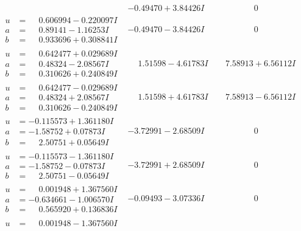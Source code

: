 \documentclass[1p]{elsarticle_modified}
\theoremstyle{definition}
\begin{document}
$$\begin{array}{c|c|c}
 & -0.49470 + 3.84426 I & \phantom{-0.000000 } 0 \\ \hline\begin{aligned}
u &= \phantom{-}0.606994 - 0.220097 I \\
a &= \phantom{-}0.89141 - 1.16253 I \\
b &= \phantom{-}0.933696 + 0.308841 I\end{aligned}
 & -0.49470 - 3.84426 I & \phantom{-0.000000 } 0 \\ \hline\begin{aligned}
u &= \phantom{-}0.642477 + 0.029689 I \\
a &= \phantom{-}0.48324 - 2.08567 I \\
b &= \phantom{-}0.310626 + 0.240849 I\end{aligned}
 & \phantom{-}1.51598 - 4.61783 I & \phantom{-}7.58913 + 6.56112 I \\ \hline\begin{aligned}
u &= \phantom{-}0.642477 - 0.029689 I \\
a &= \phantom{-}0.48324 + 2.08567 I \\
b &= \phantom{-}0.310626 - 0.240849 I\end{aligned}
 & \phantom{-}1.51598 + 4.61783 I & \phantom{-}7.58913 - 6.56112 I \\ \hline\begin{aligned}
u &= -0.115573 + 1.361180 I \\
a &= -1.58752 + 0.07873 I \\
b &= \phantom{-}2.50751 + 0.05649 I\end{aligned}
 & -3.72991 - 2.68509 I & \phantom{-0.000000 } 0 \\ \hline\begin{aligned}
u &= -0.115573 - 1.361180 I \\
a &= -1.58752 - 0.07873 I \\
b &= \phantom{-}2.50751 - 0.05649 I\end{aligned}
 & -3.72991 + 2.68509 I & \phantom{-0.000000 } 0 \\ \hline\begin{aligned}
u &= \phantom{-}0.001948 + 1.367560 I \\
a &= -0.634661 - 1.006570 I \\
b &= \phantom{-}0.565920 + 0.136836 I\end{aligned}
 & -0.09493 - 3.07336 I & \phantom{-0.000000 } 0 \\ \hline\begin{aligned}
u &= \phantom{-}0.001948 - 1.367560 I \\

\end{aligned}
\end{array}$$
\end{document}
